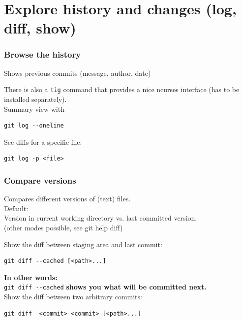 \documentclass[handout,notes]{gittalk}
\newcommand{\hlcommand}[1]{ %
\colorbox{base3}{\small \texttt{#1}}
}
\begin{document}
\section{Explore history and changes (log, diff, show)}

\begin{frame}[fragile]
\frametitle{Browse the history}
\begin{tcolorbox}[title=git log]
Shows previous commits (message, author, date)
\end{tcolorbox}
\vspace*{1em}
There is also a \hlcommand{tig} command that provides a nice ncurses interface
(has to be installed separately).\\[1em]
Summary view with
\begin{lstlisting}[basicstyle=\normalsize\ttfamily]
git log --oneline
\end{lstlisting}
\vspace*{1em}
See diffs for a specific file:
\begin{lstlisting}[basicstyle=\normalsize\ttfamily]
git log -p <file>
\end{lstlisting}
\end{frame}

\begin{frame}[fragile]
\frametitle{Compare versions}
\begin{tcolorbox}[title=git diff]
Compares different versions of (text) files.\\[0.5em]
Default:\\Version in current working directory vs. last committed version.\\
(other modes possible, see git help diff)
\end{tcolorbox}
\vspace*{1em}
Show the diff between staging area and last commit:
\begin{lstlisting}[basicstyle=\normalsize\ttfamily]
git diff --cached [<path>...]
\end{lstlisting}
\textbf{In other words:}\\
\hlcommand{git diff -{}-cached} \textbf{shows you what will be committed next.}\\[1em]
Show the diff between two arbitrary commits:
\begin{lstlisting}[basicstyle=\normalsize\ttfamily]
git diff  <commit> <commit> [<path>...]
\end{lstlisting}

\vspace*{1em}

\end{frame}
\end{document}
